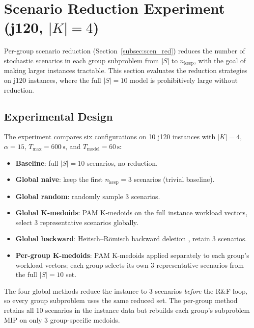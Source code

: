 \section{Scenario Reduction Experiment (j120, $|K|=4$)}
\label{sec:scen_red_exp}
Per-group scenario reduction
(Section~\ref{subsec:scen_red}) reduces the number of
stochastic scenarios in each group subproblem from $|S|$ to
$n_{\mathrm{keep}}$, with the goal of making larger instances
tractable. This section evaluates the reduction strategies on
j120 instances, where the full $|S|=10$ model is prohibitively
large without reduction.
\subsection{Experimental Design}
The experiment compares six configurations on 10 j120 instances
with $|K|=4$, $\alpha=15$, $T_{\max}=600\,\text{s}$, and
$T_{\mathrm{model}}=60\,\text{s}$:
\begin{itemize}
  \item \textbf{Baseline}: full $|S|=10$ scenarios, no reduction.
  \item \textbf{Global naive}: keep the first $n_{\mathrm{keep}}=3$
        scenarios (trivial baseline).
  \item \textbf{Global random}: randomly sample 3 scenarios.
  \item \textbf{Global K-medoids}: PAM K-medoids on the full
        instance workload vectors, select 3 representative
        scenarios globally.
  \item \textbf{Global backward}: Heitsch--R\"omisch backward
        deletion \parencite{Heitsch2003}, retain 3 scenarios.
  \item \textbf{Per-group K-medoids}: PAM K-medoids applied
        separately to each group's workload vectors; each group
        selects its own 3 representative scenarios from the full
        $|S|=10$ set.
\end{itemize}
\noindent
The four global methods reduce the instance to 3 scenarios
\emph{before} the R\&F loop, so every group subproblem uses the
same reduced set. The per-group method retains all 10 scenarios
in the instance data but rebuilds each group's subproblem MIP on
only 3 group-specific medoids.
